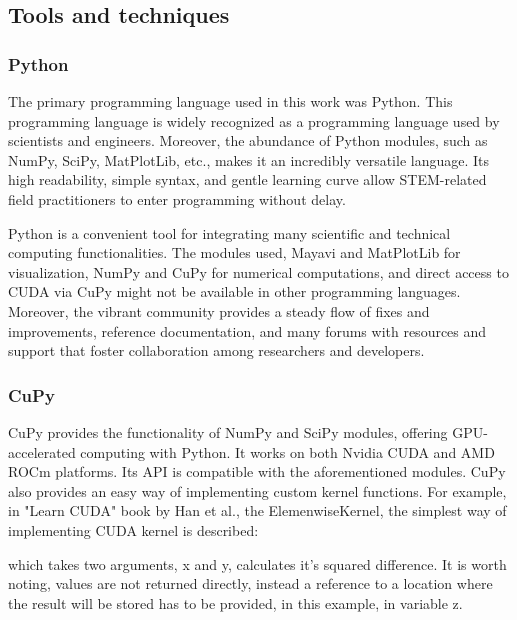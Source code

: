 \cite{kingma_adam:_2017}
\cite{adam_geeks}

\subsection{Tools and techniques}

\subsubsection{Python}

The primary programming language used in this work was Python. This programming language is widely recognized as a programming language used by scientists and engineers. Moreover, the abundance of Python modules, such as NumPy, SciPy, MatPlotLib, etc., makes it an incredibly versatile language. Its high readability, simple syntax, and gentle learning curve allow STEM-related field practitioners to enter programming without delay.

Python is a convenient tool for integrating many scientific and technical computing functionalities. The modules used, Mayavi and MatPlotLib for visualization, NumPy and CuPy for numerical computations, and direct access to CUDA via CuPy might not be available in other programming languages. Moreover, the vibrant community provides a steady flow of fixes and improvements, reference documentation, and many forums with resources and support that foster collaboration among researchers and developers.\cite{python}

\subsubsection{CuPy}

CuPy provides the functionality of NumPy and SciPy modules, offering GPU-accelerated computing with Python. It works on both Nvidia CUDA and AMD ROCm platforms. Its API is compatible with the aforementioned modules.\cite{cupy_overview} CuPy also provides an easy way of implementing custom kernel functions. For example, in "Learn CUDA" book by Han et al., the ElemenwiseKernel, the simplest way of implementing CUDA kernel is described:\cite{learn_cuda}

\vspace{0.2cm}

which takes two arguments, x and y, calculates it's squared difference. It is worth noting, values are not returned directly, instead a reference to a location where the result will be stored has to be provided, in this example, in variable z.

